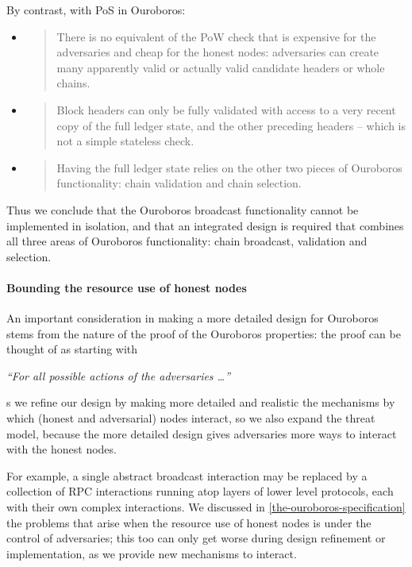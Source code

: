 \documentclass[11pt,a4paper]{article}
\begin{document}
By contrast, with PoS in Ouroboros:

\begin{itemize}
\item
  \begin{quote}
  There is no equivalent of the PoW check that is expensive for the
  adversaries and cheap for the honest nodes: adversaries can create
  many apparently valid or actually valid candidate headers or whole
  chains.
  \end{quote}
\item
  \begin{quote}
  Block headers can only be fully validated with access to a very recent
  copy of the full ledger state, and the other preceding headers --
  which is not a simple stateless check.
  \end{quote}
\item
  \begin{quote}
  Having the full ledger state relies on the other two pieces of
  Ouroboros functionality: chain validation and chain selection.
  \end{quote}
\end{itemize}

Thus we conclude that the Ouroboros broadcast functionality cannot be
implemented in isolation, and that an integrated design is required that
combines all three areas of Ouroboros functionality: chain broadcast,
validation and selection.

\paragraph{Bounding the resource use of honest nodes}

An important consideration in making a more detailed design for
Ouroboros stems from the nature of the proof of the Ouroboros
properties: the proof can be thought of as starting with

\emph{``For all possible actions of the adversaries \ldots{}'' }

s we refine our design by making more detailed and realistic the
mechanisms by which (honest and adversarial) nodes interact, so we also
expand the threat model, because the more detailed design gives
adversaries more ways to interact with the honest nodes.

For example, a single abstract broadcast interaction may be replaced by
a collection of RPC interactions running atop layers of lower level
protocols, each with their own complex interactions. We discussed in
\cref{the-ouroboros-specification} the
problems that arise when the resource use of honest nodes is under the
control of adversaries; this too can only get worse during design
refinement or implementation, as we provide new mechanisms to interact.
\end{document}
